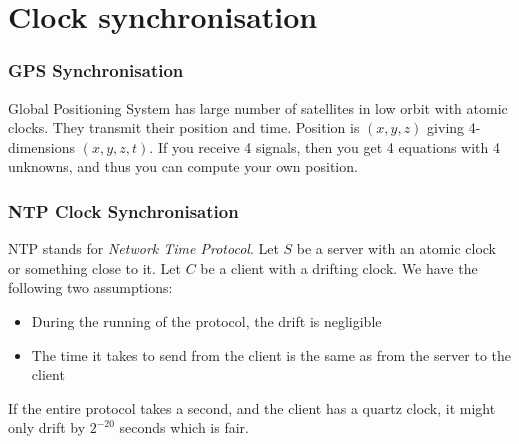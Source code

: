 \section{Clock synchronisation}
        \begin{frame}
            \frametitle{GPS Synchronisation}
                Global Positioning System has large number of satellites in low orbit with atomic clocks. They transmit their position and time. Position is $(x, y, z)$ giving 4-dimensions $(x, y, z, t)$. If you receive 4 signals, then you get 4 equations with 4 unknowns, and thus you can compute your own position. 
        \end{frame}
        \begin{frame}
            \frametitle{NTP Clock Synchronisation}
                NTP stands for \textit{Network Time Protocol}. Let $S$ be a server with an atomic clock or something close to it. Let $C$ be a client with a drifting clock. We have the following two assumptions:
                \begin{itemize}
                    \item During the running of the protocol, the drift is negligible
                    \item The time it takes to send from the client is the same as from the server to the client
                \end{itemize}
                If the entire protocol takes a second, and the client has a quartz clock, it might only drift by $2^{-20}$ seconds which is fair. 
        \end{frame}


